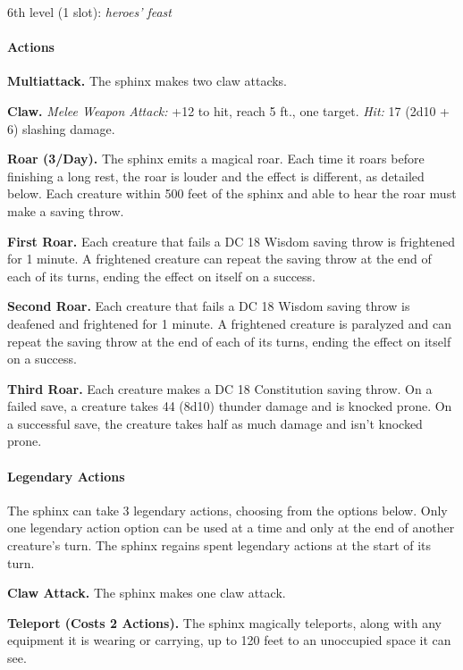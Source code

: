 \documentclass[
]{article}
\begin{document}
6th level (1 slot): \emph{heroes' feast}

\hypertarget{actions-10}{%
\paragraph{Actions}\label{actions-10}}

\textbf{Multiattack.} The sphinx makes two claw attacks.

\textbf{Claw.} \emph{Melee Weapon Attack:} +12 to hit, reach 5 ft., one
target. \emph{Hit:} 17 (2d10 + 6) slashing damage.

\textbf{Roar (3/Day).} The sphinx emits a magical roar. Each time it
roars before finishing a long rest, the roar is louder and the effect is
different, as detailed below. Each creature within 500 feet of the
sphinx and able to hear the roar must make a saving throw.

\textbf{First Roar.} Each creature that fails a DC 18 Wisdom saving
throw is frightened for 1 minute. A frightened creature can repeat the
saving throw at the end of each of its turns, ending the effect on
itself on a success.

\textbf{Second Roar.} Each creature that fails a DC 18 Wisdom saving
throw is deafened and frightened for 1 minute. A frightened creature is
paralyzed and can repeat the saving throw at the end of each of its
turns, ending the effect on itself on a success.

\textbf{Third Roar.} Each creature makes a DC 18 Constitution saving
throw. On a failed save, a creature takes 44 (8d10) thunder damage and
is knocked prone. On a successful save, the creature takes half as much
damage and isn't knocked prone.

\hypertarget{legendary-actions}{%
\paragraph{Legendary Actions}\label{legendary-actions}}

The sphinx can take 3 legendary actions, choosing from the options
below. Only one legendary action option can be used at a time and only
at the end of another creature's turn. The sphinx regains spent
legendary actions at the start of its turn.

\textbf{Claw Attack.} The sphinx makes one claw attack.

\textbf{Teleport (Costs 2 Actions).} The sphinx magically teleports,
along with any equipment it is wearing or carrying, up to 120 feet to an
unoccupied space it can see.
\end{document}
